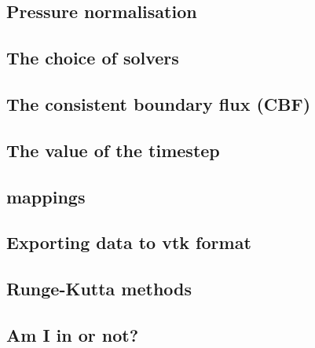 \documentclass[a4paper]{article}
\begin{document}
\subsection{Pressure normalisation}  %

\newpage %
\subsection{The choice of solvers\label{sec_solvers}}  %

\newpage %
\subsection{The consistent boundary flux (CBF)}  %

\newpage %
\subsection{The value of the timestep}  %

\newpage %
\subsection{mappings}  %

\newpage %
\subsection{Exporting data to vtk format}  %

\newpage %
\subsection{Runge-Kutta methods}  %

\newpage %
\subsection{Am I in or not?}  %
\end{document}
